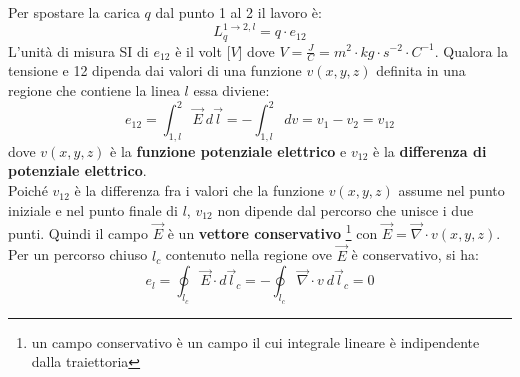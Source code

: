 \documentclass{article}
\begin{document}
Per spostare la carica $q$ dal punto 1 al 2 il lavoro è:
\[
    L^{1 \rightarrow 2,l}_q = q \cdot e_{12}
\]
L'unità di misura SI di $e_{12}$ è il volt [$V$] dove $V = \frac{J}{C} = m^2 \cdot kg \cdot s^{-2} \cdot C^{-1}$.
Qualora la tensione e 12 dipenda dai valori di una
funzione $v(x,y,z)$ definita in una regione che contiene la linea $l$ essa diviene:
\[
    e_{12} = \int_{1,l}^{2}\vec E \ d\vec l = - \int_{1,l}^{2} dv = v_1 - v_2 = v_{12}
\]
dove $v(x,y,z)$ è la \textbf{funzione potenziale elettrico} e $v_{12}$
è la \textbf{differenza di potenziale elettrico}.
\vspace*{0.1cm}\\
Poiché $v_{12}$ è la differenza fra i valori che la funzione $v(x,y,z)$ assume nel punto
iniziale e nel punto finale di $l$, $v_{12}$ non dipende dal percorso che unisce i due
punti. Quindi il campo $\vec E$ è un \textbf{vettore conservativo} \footnote{un campo conservativo è un campo il cui integrale lineare è indipendente dalla traiettoria} con $\vec E = \vec \nabla \cdot v(x,y,z)$.
\vspace*{0.1cm}\\
Per un percorso chiuso $l_c$ contenuto nella regione ove $\vec E$ è conservativo, si ha:
\[
    e_l = \oint _{l_c} \vec E \cdot d \vec l_c = - \oint _{l_c} \vec \nabla \cdot v  \ d\vec l_c = 0
\]
\end{document}
